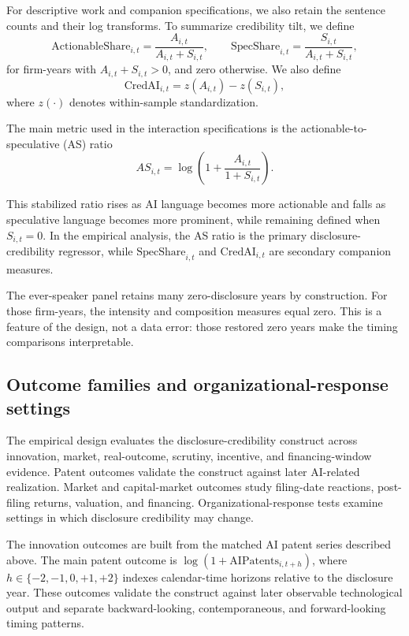 For descriptive work and companion specifications, we also retain the sentence counts and their log transforms. To summarize credibility tilt, we define
\[
\mathrm{ActionableShare}_{i,t} = \frac{A_{i,t}}{A_{i,t} + S_{i,t}},
\qquad
\mathrm{SpecShare}_{i,t} = \frac{S_{i,t}}{A_{i,t} + S_{i,t}},
\]
for firm-years with $A_{i,t} + S_{i,t} > 0$, and zero otherwise. We also define
\[
\mathrm{CredAI}_{i,t} = z(A_{i,t}) - z(S_{i,t}),
\]
where $z(\cdot)$ denotes within-sample standardization.

The main metric used in the interaction specifications is the actionable-to-speculative (AS) ratio
\[
AS_{i,t} = \log\left(1 + \frac{A_{i,t}}{1 + S_{i,t}}\right).
\]

This stabilized ratio rises as AI language becomes more actionable and falls as speculative language becomes more prominent, while remaining defined when $S_{i,t} = 0$. In the empirical analysis, the AS ratio is the primary disclosure-credibility regressor, while $\mathrm{SpecShare}_{i,t}$ and $\mathrm{CredAI}_{i,t}$ are secondary companion measures.

The ever-speaker panel retains many zero-disclosure years by construction. For those firm-years, the intensity and composition measures equal zero. This is a feature of the design, not a data error: those restored zero years make the timing comparisons interpretable.

\subsection{Outcome families and organizational-response settings}

The empirical design evaluates the disclosure-credibility construct across innovation, market, real-outcome, scrutiny, incentive, and financing-window evidence. Patent outcomes validate the construct against later AI-related realization. Market and capital-market outcomes study filing-date reactions, post-filing returns, valuation, and financing. Organizational-response tests examine settings in which disclosure credibility may change.

The innovation outcomes are built from the matched AI patent series described above. The main patent outcome is $\log(1+\mathrm{AIPatents}_{i,t+h})$, where $h \in \{-2,-1,0,+1,+2\}$ indexes calendar-time horizons relative to the disclosure year. These outcomes validate the construct against later observable technological output and separate backward-looking, contemporaneous, and forward-looking timing patterns.

